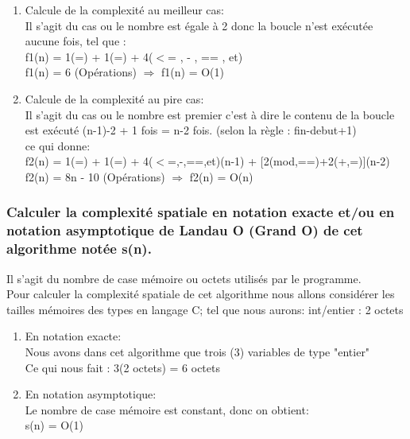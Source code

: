 \documentclass[12pt]{article}
\begin{document}
\begin{enumerate}
	\item Calcule de la complexité au meilleur cas:
	\\
	Il s'agit du cas ou le nombre est égale à 2 donc la boucle n'est exécutée aucune fois, tel que :
	\\
	f1(n) = 1(=) + 1(=) + 4($<$= , - , == , et) 
	\\
	\color{blue}
	f1(n) = 6 (Opérations) $\Rightarrow$ f1(n) = O(1)
	\color{black}
	\\
	\item Calcule de la complexité au pire cas:
	\\
	Il s'agit du cas ou le nombre est premier c'est à dire le contenu de la boucle est exécuté (n-1)-2 + 1 fois = n-2 fois.
	(selon la règle : fin-debut+1)
	\\
	ce qui donne:
	\\
	f2(n) = 1(=) + 1(=) + 4($<$=,-,==,et)(n-1) + [2(mod,==)+2(+,=)](n-2) 
	\\
	\color{blue}
	f2(n) = 8n - 10 (Opérations) $\Rightarrow$ f2(n) = O(n)
	\color{black}
\end{enumerate}




\subsubsection{Calculer la complexité spatiale en notation exacte et/ou en notation asymptotique de Landau O (Grand O) de  cet  algorithme notée s(n).}
Il s'agit du nombre de case mémoire ou octets utilisés par le programme.
\\
Pour calculer la complexité spatiale de cet algorithme nous allons considérer les tailles mémoires des types en langage C; tel que nous aurons:
int/entier : 2 octets
\\
\begin{enumerate}
	\item En notation exacte:
	\\
Nous avons dans cet algorithme que trois (3) variables de type "entier"
\\
Ce qui nous fait :
\color{blue}
 3(2 octets) = 6 octets
\color{black}
\\
 
	\item En notation asymptotique:
	\\
	Le nombre de case mémoire est constant, donc on obtient:
	\\
	\color{blue}
	s(n) = O(1)
	\color{black}
	
	
\end{enumerate}
\end{document}
